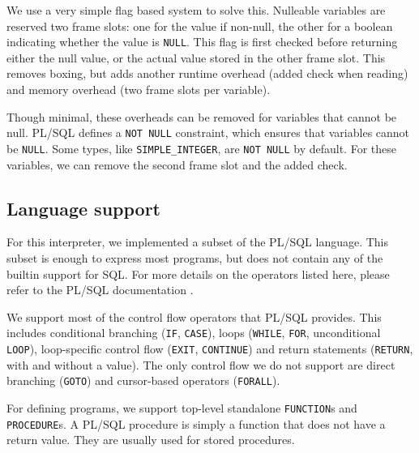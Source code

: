 \documentclass[twoside,11pt,a4paper]{article}
\newcommand{\java}[1]{\textsf{#1}}
\newcommand{\pls}[1]{\small\texttt{#1}\normalsize}
\newcommand{\plstype}[1]{\pls{#1}}
\newcommand{\simpleint}{\plstype{SIMPLE\_INTEGER}}
\newcommand{\plsnull}{\pls{NULL}}
\begin{document}
We use a very simple flag based system to solve this. Nulleable variables are reserved two frame slots: one for the value if non-null, the other for a \java{boolean} indicating whether the value is \plsnull{}. This flag is first checked before returning either the null value, or the actual value stored in the other frame slot. This removes boxing, but adds another runtime overhead (added check when reading) and memory overhead (two frame slots per variable).

Though minimal, these overheads can be removed for variables that cannot be null. PL/SQL defines a \pls{NOT NULL} constraint, which ensures that variables cannot be \plsnull{}. Some types, like \simpleint{}, are \pls{NOT NULL} by default. For these variables, we can remove the second frame slot and the added check.

\subsection{Language support}


For this interpreter, we implemented a subset of the PL/SQL language. This subset is enough to express most programs, but does not contain any of the builtin support for SQL. For more details on the operators listed here, please refer to the PL/SQL documentation \cite{plsdoc}.

We support most of the control flow operators that PL/SQL provides. This includes conditional branching (\pls{IF}, \pls{CASE}), loops (\pls{WHILE}, \pls{FOR}, unconditional \pls{LOOP}), loop-specific control flow (\pls{EXIT}, \pls{CONTINUE}) and return statements (\pls{RETURN}, with and without a value). The only control flow we do not support are direct branching (\pls{GOTO}) and cursor-based operators (\pls{FORALL}).

For defining programs, we support top-level standalone \pls{FUNCTION}s and \pls{PROCEDURE}s. A PL/SQL procedure is simply a function that does not have a return value. They are usually used for stored procedures.
\end{document}
